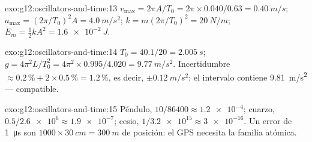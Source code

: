 \begin{solution}{exo:g12:oscillators-and-time:13}
$v_{\max} = 2\pi A/T_0 = 2\pi \times 0.040/0.63 = \qty{0.40}{m/s}$;
$a_{\max} = (2\pi/T_0)^2 A = \qty{4.0}{m/s^2}$;
$k = m(2\pi/T_0)^2 = \qty{20}{N/m}$;
$E_m = \tfrac12 kA^2 = \qty{1.6e-2}{J}$.
\end{solution}

\begin{solution}{exo:g12:oscillators-and-time:14}
$T_0 = 40.1/20 = \qty{2.005}{s}$;
$g = 4\pi^2 L/T_0^2 = 4\pi^2 \times 0.995/4.020 = \qty{9.77}{m/s^2}$.
Incertidumbre $\approx 0.2\,\% + 2 \times 0.5\,\% = 1.2\,\%$, es decir,
$\pm\qty{0.12}{m/s^2}$: el intervalo contiene \qty{9.81}{m/s^2} ---
compatible.
\end{solution}

\begin{solution}{exo:g12:oscillators-and-time:15}
Péndulo, $10/86400 \approx \num{1.2e-4}$; cuarzo,
$0.5/\num{2.6e6} \approx \num{1.9e-7}$; cesio,
$1/\num{3.2e15} \approx \num{3e-16}$. Un error de \qty{1}{\micro s} son
$\num{1000} \times \qty{30}{cm} = \qty{300}{m}$ de posición: el GPS
necesita la familia atómica.
\end{solution}

